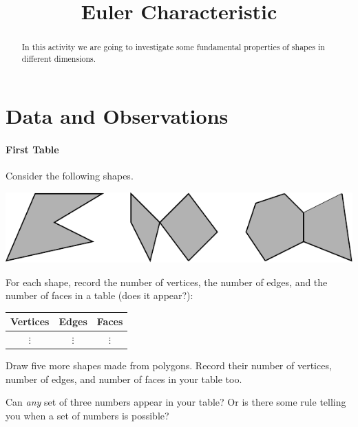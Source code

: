 \documentclass{ximera}
\title{Euler Characteristic}
\begin{document}
\begin{abstract}
In this activity we are going to investigate some fundamental
properties of shapes in different dimensions.
\end{abstract}
\maketitle

\section*{Data and Observations}

\paragraph{First Table}

\begin{question}
Consider the following shapes.
\begin{image}
\includegraphics{eulerCharPoly.pdf}
\end{image}
For each shape, record the number of vertices, the number of edges,
and the number of faces in a table (does it appear?):
\begin{center}
\begin{tabular}{c|c|c}
Vertices & Edges & Faces\\
\hline\hline
 $\vdots$  & $\vdots$  & $\vdots$  \\ 
\end{tabular}
\end{center}
\end{question}

\begin{question}
Draw five more shapes made from polygons. Record their number of
vertices, number of edges, and number of faces in your table too.
\end{question}


\begin{question}
Can \textit{any} set of three numbers appear in your table? Or is
there some rule telling you when a set of numbers is possible? 
\end{question}
\end{document}
